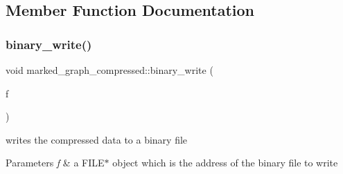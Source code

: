 \subsection{Member Function Documentation}
\mbox{\label{classmarked__graph__compressed_ab9cdb7fc43badd58fb5202f74ffac723}} 
\subsubsection{\texorpdfstring{binary\+\_\+write()}{binary\_write()}}
{\footnotesize\ttfamily void marked\+\_\+graph\+\_\+compressed\+::binary\+\_\+write (\begin{DoxyParamCaption}\item[{F\+I\+LE $\ast$}]{f }\end{DoxyParamCaption})}



writes the compressed data to a binary file 


\begin{DoxyParams}{Parameters}
{\em f} & a {\ttfamily F\+I\+L\+E$\ast$} object which is the address of the binary file to write \\
\hline
\end{DoxyParams}

